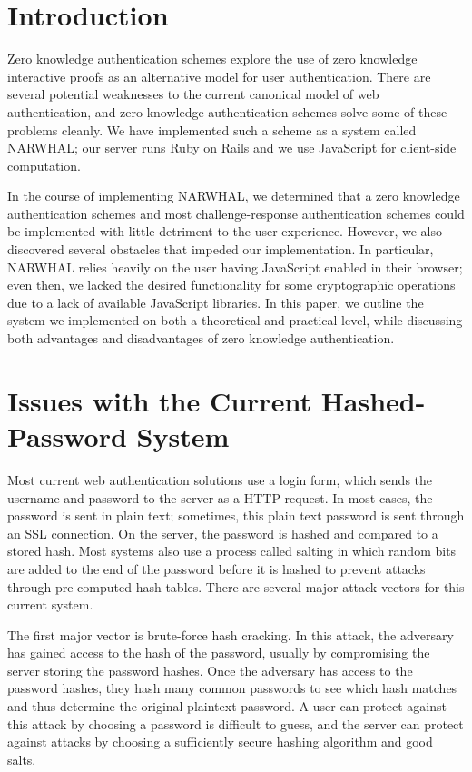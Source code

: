 \documentclass[11pt]{article}
\begin{document}
\section{Introduction}

Zero knowledge authentication schemes explore the use of zero knowledge interactive proofs as an alternative model for user authentication.  There are several potential weaknesses to the current canonical model of web authentication, and zero knowledge authentication schemes solve some of these problems cleanly.  We have implemented such a scheme as a system called NARWHAL; our server runs Ruby on Rails and we use JavaScript for client-side computation.

In the course of implementing NARWHAL, we determined that a zero knowledge authentication schemes and  most challenge-response authentication schemes could be implemented with little detriment to the user experience.  However, we also discovered several obstacles that impeded our implementation.  In particular, NARWHAL relies heavily on the user having JavaScript enabled in their browser; even then, we lacked the desired functionality for some cryptographic operations due to a lack of available JavaScript libraries.  In this paper, we outline the system we implemented on both a theoretical and practical level, while discussing both advantages and disadvantages of zero knowledge authentication.


\section{Issues with the Current Hashed-Password System}

Most current web authentication solutions use a login form, which sends the username and password to the server as a HTTP request.  In most cases, the password is sent in plain text; sometimes, this plain text password is sent through an SSL connection.  On the server, the password is hashed and compared to a stored hash.  Most systems also use a process called salting in which random bits are added to the end of the password before it is hashed to prevent attacks through pre-computed hash tables\cite{Zhou}.  There are several major attack vectors for this current system.

The first major vector is brute-force hash cracking\cite{Lum}.  In this attack, the adversary has gained access to the hash of the password, usually by compromising the server storing the password hashes.  Once the adversary has access to the password hashes, they hash many common passwords to see which hash matches and thus determine the original plaintext password.  A user can protect against this attack by choosing a password is difficult to guess, and the server can protect against attacks by choosing a sufficiently secure hashing algorithm and good salts.
\end{document}
